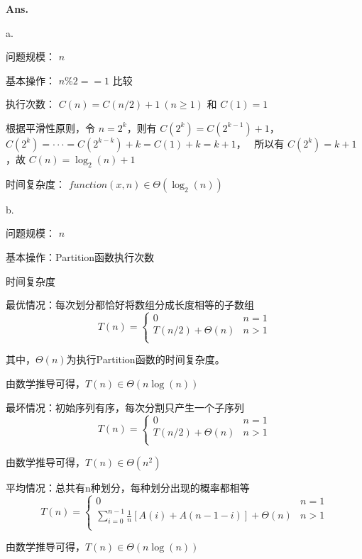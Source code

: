 \documentclass[12pt, a4paper, UTF8, fontset=windows]{ctexbook}
\newenvironment{solution}{\par\noindent\textbf{Ans.}}{\par}
\begin{document}
\begin{solution}
    
    a. 
    
    问题规模： $n$

    基本操作： $n \% 2 == 1$ 比较

    执行次数： $C(n) = C(n/2) + 1 ~(n \ge 1)$ 和 $C(1) = 1$

    根据平滑性原则，令 $n=2^k$，则有 $C(2^k) = C(2^{k-1}) + 1$，\ 
    $C(2^k) = ··· = C(2^{k-k}) + k = C(1) + k = k + 1$， \
    所以有 $C(2^k) = k + 1$，故 $C(n) = \log_{2}(n) + 1$

    时间复杂度： $function(x, n) \in \Theta(\log_{2}(n))$
    \vspace{2mm}  %

    b. 
    
    问题规模： $n$

    基本操作：Partition函数执行次数

    时间复杂度

    最优情况：每次划分都恰好将数组分成长度相等的子数组 
    \begin{equation}
        T(n)=\left\{
        \begin{array}{cl}
        0           & n = 1 \\
        T(n/2) + \Theta(n)  & n > 1 \\
        \end{array} \right.
    \end{equation}   

    其中，$\Theta(n)$为执行Partition函数的时间复杂度。

    由数学推导可得，$T(n) \in \Theta(n\log(n))$
    
    最坏情况：初始序列有序，每次分割只产生一个子序列
    \begin{equation}
        T(n)=\left\{
        \begin{array}{cl}
        0           & n = 1 \\
        T(n/2) + \Theta(n)  & n > 1 \\
        \end{array} \right.
    \end{equation}    

    由数学推导可得，$T(n) \in \Theta(n^2)$

    平均情况：总共有n种划分，每种划分出现的概率都相等
    \begin{equation}
        T(n)=\left\{
        \begin{array}{cl}
        0           & n = 1 \\
        \sum_{i=0}^{n-1} \frac{1}{n}[A(i)+A(n-1-i)] + \Theta(n)  & n > 1 \\
        \end{array} \right.
    \end{equation}     

    由数学推导可得，$T(n) \in \Theta(n\log(n))$
\end{solution}
\end{document}
